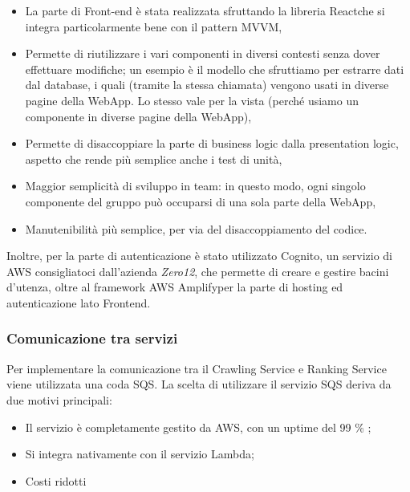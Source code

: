 \begin{itemize}
\item La parte di Front-end è stata realizzata sfruttando la libreria React\glo che si integra particolarmente bene con il pattern MVVM,
\item Permette di riutilizzare i vari componenti in diversi contesti senza dover effettuare modifiche; un esempio è il modello che sfruttiamo per estrarre dati dal database, i quali (tramite la stessa chiamata) vengono usati in diverse pagine della WebApp. Lo stesso vale per la vista (perché usiamo un componente in diverse pagine della WebApp),
\item Permette di disaccoppiare la parte di business logic dalla presentation logic, aspetto che rende più semplice anche i test di unità,
\item Maggior semplicità di sviluppo in team: in questo modo, ogni singolo componente del gruppo può occuparsi di una sola parte della WebApp,
\item Manutenibilità più semplice, per via del disaccoppiamento del codice.
\end{itemize}
Inoltre, per la parte di autenticazione è stato utilizzato Cognito\glo, un servizio di AWS consigliatoci dall'azienda \textit{Zero12}, che permette di creare e gestire bacini d'utenza, oltre al framework AWS Amplify\glo per la parte di hosting ed autenticazione lato Frontend.


\subsubsection{Comunicazione tra servizi}
Per implementare la comunicazione tra il Crawling Service e Ranking Service viene utilizzata una coda SQS. La scelta di utilizzare il servizio SQS deriva da due motivi principali:
\begin{itemize}
\item Il servizio è completamente gestito da AWS, con un uptime del 99 \% ;
\item Si integra nativamente con il servizio Lambda\glo ;
\item Costi ridotti
\end{itemize}


